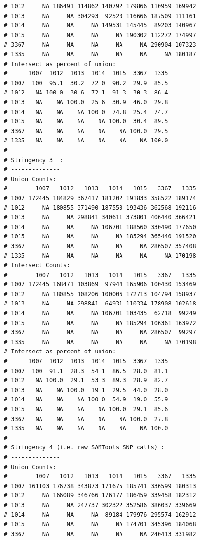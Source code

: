\documentclass{article}\usepackage[]{graphicx}\usepackage[]{color}
\makeatletter
\newenvironment{kframe}{%
 \def\at@end@of@kframe{}%
 \ifinner\ifhmode%
  \def\at@end@of@kframe{\end{minipage}}%
  \begin{minipage}{\columnwidth}%
 \fi\fi%
 \def\FrameCommand##1{\hskip\@totalleftmargin \hskip-\fboxsep
 \colorbox{shadecolor}{##1}\hskip-\fboxsep
     \hskip-\linewidth \hskip-\@totalleftmargin \hskip\columnwidth}%
 \MakeFramed {\advance\hsize-\width
   \@totalleftmargin\z@ \linewidth\hsize
   \@setminipage}}%
 {\par\unskip\endMakeFramed%
 \at@end@of@kframe}
\newenvironment{knitrout}{}{} %
\makeatother
\begin{document}
\begin{knitrout}
\begin{kframe}
\begin{verbatim}
# 1012     NA 186491 114862 140792 179866 110959 169942
# 1013     NA     NA 304293  92520 116666 187509 111161
# 1014     NA     NA     NA 149531 145445  89203 140967
# 1015     NA     NA     NA     NA 190302 112272 174997
# 3367     NA     NA     NA     NA     NA 290904 107323
# 1335     NA     NA     NA     NA     NA     NA 180187
# Intersect as percent of union:
#      1007  1012  1013  1014  1015  3367  1335
# 1007  100  95.1  30.2  72.0  90.2  29.9  85.5
# 1012   NA 100.0  30.6  72.1  91.3  30.3  86.4
# 1013   NA    NA 100.0  25.6  30.9  46.0  29.8
# 1014   NA    NA    NA 100.0  74.8  25.4  74.7
# 1015   NA    NA    NA    NA 100.0  30.4  89.5
# 3367   NA    NA    NA    NA    NA 100.0  29.5
# 1335   NA    NA    NA    NA    NA    NA 100.0
# 
# Stringency 3  :
# --------------
# Union Counts:
#        1007   1012   1013   1014   1015   3367   1335
# 1007 172445 184829 367417 181202 191833 358522 189174
# 1012     NA 180855 371490 187550 193436 362568 192116
# 1013     NA     NA 298841 340611 373801 406440 366421
# 1014     NA     NA     NA 106701 188560 330490 177650
# 1015     NA     NA     NA     NA 185294 365440 191520
# 3367     NA     NA     NA     NA     NA 286507 357408
# 1335     NA     NA     NA     NA     NA     NA 170198
# Intersect Counts:
#        1007   1012   1013   1014   1015   3367   1335
# 1007 172445 168471 103869  97944 165906 100430 153469
# 1012     NA 180855 108206 100006 172713 104794 158937
# 1013     NA     NA 298841  64931 110334 178908 102618
# 1014     NA     NA     NA 106701 103435  62718  99249
# 1015     NA     NA     NA     NA 185294 106361 163972
# 3367     NA     NA     NA     NA     NA 286507  99297
# 1335     NA     NA     NA     NA     NA     NA 170198
# Intersect as percent of union:
#      1007  1012  1013  1014  1015  3367  1335
# 1007  100  91.1  28.3  54.1  86.5  28.0  81.1
# 1012   NA 100.0  29.1  53.3  89.3  28.9  82.7
# 1013   NA    NA 100.0  19.1  29.5  44.0  28.0
# 1014   NA    NA    NA 100.0  54.9  19.0  55.9
# 1015   NA    NA    NA    NA 100.0  29.1  85.6
# 3367   NA    NA    NA    NA    NA 100.0  27.8
# 1335   NA    NA    NA    NA    NA    NA 100.0
# 
# Stringency 4 (i.e. raw SAMTools SNP calls) :
# --------------
# Union Counts:
#        1007   1012   1013   1014   1015   3367   1335
# 1007 161103 176738 343873 171675 185741 336599 180313
# 1012     NA 166089 346766 176177 186459 339458 182312
# 1013     NA     NA 247737 302322 352586 386037 339669
# 1014     NA     NA     NA  89184 179976 295574 162912
# 1015     NA     NA     NA     NA 174701 345396 184068
# 3367     NA     NA     NA     NA     NA 240413 331982

\end{verbatim}
\end{kframe}
\end{knitrout}
\end{document}
